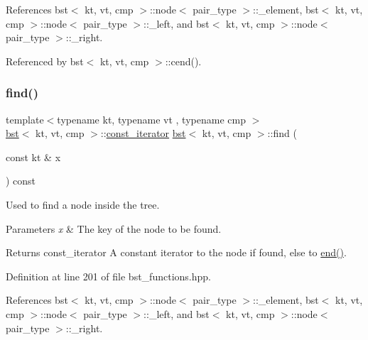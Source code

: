 References bst$<$ kt, vt, cmp $>$\+::node$<$ pair\+\_\+type $>$\+::\+\_\+element, bst$<$ kt, vt, cmp $>$\+::node$<$ pair\+\_\+type $>$\+::\+\_\+left, and bst$<$ kt, vt, cmp $>$\+::node$<$ pair\+\_\+type $>$\+::\+\_\+right.



Referenced by bst$<$ kt, vt, cmp $>$\+::cend().

\mbox{\label{classbst_a2971e3ad8b28cf5bdf08128eee48d26d}} 
\subsubsection{\texorpdfstring{find()}{find()}\hspace{0.1cm}{\footnotesize\ttfamily [2/2]}}
{\footnotesize\ttfamily template$<$typename kt, typename vt , typename cmp $>$ \\
\hyperlink{classbst}{bst}$<$ kt, vt, cmp $>$\+::\hyperlink{classbst_a72485696d999bf489c6156f6327a2163}{const\+\_\+iterator} \hyperlink{classbst}{bst}$<$ kt, vt, cmp $>$\+::find (\begin{DoxyParamCaption}\item[{const kt \&}]{x }\end{DoxyParamCaption}) const\hspace{0.3cm}{\ttfamily [noexcept]}}



Used to find a node inside the tree. 


\begin{DoxyParams}{Parameters}
{\em x} & The key of the node to be found. \\
\hline
\end{DoxyParams}
\begin{DoxyReturn}{Returns}
const\+\_\+iterator A constant iterator to the node if found, else to \hyperlink{classbst_aed3a831efc810b5084cb0c9f4adeb16a}{end()}. 
\end{DoxyReturn}


Definition at line 201 of file bst\+\_\+functions.\+hpp.



References bst$<$ kt, vt, cmp $>$\+::node$<$ pair\+\_\+type $>$\+::\+\_\+element, bst$<$ kt, vt, cmp $>$\+::node$<$ pair\+\_\+type $>$\+::\+\_\+left, and bst$<$ kt, vt, cmp $>$\+::node$<$ pair\+\_\+type $>$\+::\+\_\+right.

\mbox{\label{classbst_aaaeffdb4fae1103a3f6185c74ce43281}} 
